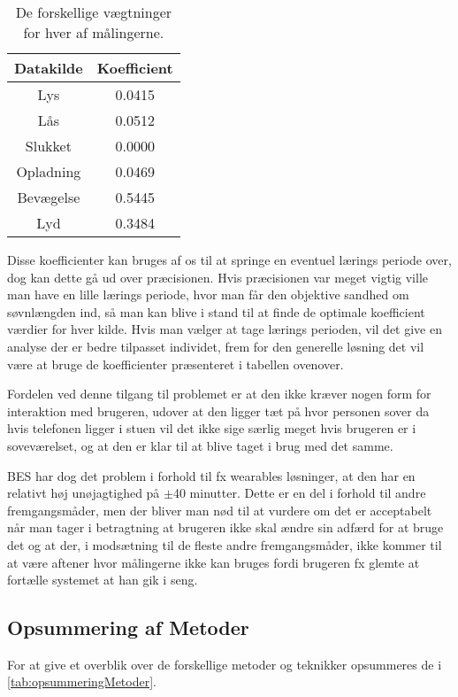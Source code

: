 \begin{table}[h]
\centering
\begin{tabular}{|c|c|}
\hline Datakilde & Koefficient\\
\hline Lys & 0.0415 \\ 
\hline Lås & 0.0512 \\ 
\hline Slukket & 0.0000 \\ 
\hline Opladning & 0.0469 \\ 
\hline Bevægelse & 0.5445 \\ 
\hline Lyd & 0.3484 \\ 
\hline 
\end{tabular}
\caption{De forskellige vægtninger for hver af målingerne.}
\label{tab:vaegtninger}
\end{table}

Disse koefficienter kan bruges af os til at springe en eventuel lærings periode over, dog kan dette gå ud over præcisionen.
Hvis præcisionen var meget vigtig ville man have en lille lærings periode, hvor man får den objektive sandhed om søvnlængden ind, så man kan blive i stand til at finde de optimale koefficient værdier for hver kilde. 
Hvis man vælger at tage lærings perioden, vil det give en analyse der er bedre tilpasset individet, frem for den generelle løsning det vil være at bruge de koefficienter præsenteret i tabellen ovenover.

Fordelen ved denne tilgang til problemet er at den ikke kræver nogen form for interaktion med brugeren, udover at den ligger tæt på hvor personen sover da hvis telefonen ligger i stuen vil det ikke sige særlig meget hvis brugeren er i soveværelset, og at den er klar til at blive taget i brug med det samme.

BES har dog det problem i forhold til fx wearables løsninger, at den har en relativt høj unøjagtighed på $\pm$40 minutter. 
Dette er en del i forhold til andre fremgangsmåder, men der bliver man nød til at vurdere om det er acceptabelt når man tager i betragtning at brugeren ikke skal ændre sin adfærd for at bruge det og at der, i modsætning til de fleste andre fremgangsmåder, ikke kommer til at være aftener hvor målingerne ikke kan bruges fordi brugeren fx glemte at fortælle systemet at han gik i seng.

\subsection{Opsummering af Metoder}
For at give et overblik over de forskellige metoder og teknikker opsummeres de i \cref{tab:opsummeringMetoder}.

